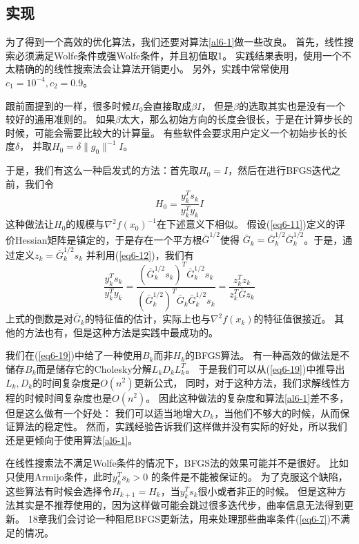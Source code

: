 \documentclass{article}
\begin{document}
\subsection{实现}
为了得到一个高效的优化算法，我们还要对算法\ref{al6-1}做一些改良。
首先，线性搜索必须满足Wolfe条件或强Wolfe条件，并且初值取1。
实践结果表明，使用一个不太精确的的线性搜索法会让算法开销更小。
另外，实践中常常使用$c_1 = 10^{-4}, c_2 = 0.9$。

跟前面提到的一样，很多时候$H_0$会直接取成$\beta I$，
但是$\beta$的选取其实也是没有一个较好的通用准则的。
如果$\beta$太大，那么初始方向的长度会很长，于是在计算步长的时候，可能会需要比较大的计算量。
有些软件会要求用户定义一个初始步长的长度$\delta$，
并取$H_0 = \delta \|g_0\|^{-1}I$。

于是，我们有这么一种启发式的方法：首先取$H_0 = I$，然后在进行BFGS迭代之前，我们令
\begin{equation}
  \label{eq6-20}
  H_0 = \frac{y_k^Ts_k}{y_k^Ty_k}I
\end{equation}
这种做法让$H_0$的规模与$\nabla^2 f(x_0)^{-1}$在下述意义下相似。
假设(\ref{eq6-11})定义的评价Hessian矩阵是镇定的，于是存在一个平方根$\bar{G}^{1/2}$使得
$\bar{G}_k =\bar{G}_k^{1/2}\bar{G}_k^{1/2}$。于是，通过定义$z_k = \bar{G}_k^{1/2}s_k$
并利用(\ref{eq6-12})，我们有
\begin{equation}
  \label{eq6-21}
  \frac{y_k^Ts_k}{y_k^Ty_k} = \frac{(\bar{G}_k^{1/2}s_k)^T\bar{G}_k^{1/2}s_k}{(\bar{G}_k^{1/2})^T\bar{G}_k\bar{G}_k^{1/2}s_k}
  = \frac{z_k^Tz_k}{z_k^T\bar{G}z_k}
\end{equation}
上式的倒数是对$\bar{G}_k$的特征值的估计，实际上也与$\nabla^2 f(x_k)$的特征值很接近。
其他的方法也有，但是这种方法是实践中最成功的。

我们在(\ref{eq6-19})中给了一种使用$B_k$而非$H_k$的BFGS算法。
有一种高效的做法是不储存$B_k$而是储存它的Cholesky分解$L_kD_kL_k^T$。
于是我们可以从(\ref{eq6-19})中推导出$L_k,D_k$的时间复杂度是$O(n^2)$更新公式，
同时，对于这种方法，我们求解线性方程的时候时间复杂度也是$O(n^2)$。
因此这种做法的复杂度和算法\ref{al6-1}差不多，
但是这么做有一个好处：
我们可以适当地增大$D_k$，当他们不够大的时候，从而保证算法的稳定性。
然而，实践经验告诉我们这样做并没有实际的好处，所以我们还是更倾向于使用算法\ref{al6-1}。

在线性搜索法不满足Wolfe条件的情况下，BFGS法的效果可能并不是很好。
比如只使用Armijo条件，此时$y_k^T s_k>0$ 的条件是不能被保证的。
为了克服这个缺陷，这些算法有时候会选择令$H_{k+1} = H_k$，当$y_k^Ts_k$很小或者非正的时候。
但是这种方法其实是不推荐使用的，因为这样做可能会跳过很多迭代步，曲率信息无法得到更新。
18章我们会讨论一种阻尼BFGS更新法，用来处理那些曲率条件(\ref{eq6-7})不满足的情况。
\end{document}
